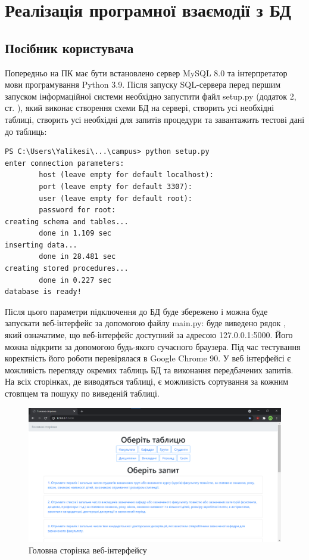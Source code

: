 \newpage
\chapter{Реалізація програмної взаємодії з БД}
\section{Посібник користувача}
Попередньо на ПК має бути встановлено сервер MySQL 8.0 та інтерпретатор мови програмування Python 3.9.
Після запуску SQL-сервера перед першим запуском інформаційної системи необхідно
запустити файл setup.py (додаток 2, ст. \pageref{setup}), який виконає створення 
схеми БД на сервері, створить усі необхідні таблиці, створить усі необхідні для запитів процедури
та завантажить тестові дані до таблиць:
\begin{lstlisting}[style=code]
PS C:\Users\Yalikesi\...\campus> python setup.py
enter connection parameters:
        host (leave empty for default localhost):
        port (leave empty for default 3307):
        user (leave empty for default root):
        password for root:
creating schema and tables...
        done in 1.109 sec
inserting data...
        done in 28.481 sec
creating stored procedures...
        done in 0.227 sec
database is ready!
\end{lstlisting}
Після цього параметри підключення до БД буде збережено і можна буде запускати веб-інтерфейс за
допомогою файлу main.py: буде виведено рядок ,
який означатиме, що веб-інтерфейс доступний за адресою 127.0.0.1:5000. Його можна відкрити за допомогою
будь-якого сучасного браузера. Під час тестування коректність його роботи перевірялася в Google Chrome 90.
У веб інтерфейсі є можливість перегляду окремих таблиць БД та виконання передбачених запитів.
На всіх сторінках, де виводяться таблиці, є можливість сортування за кожним стовпцем та пошуку по виведеній таблиці.
\begin{figure}[H]
    \centering
    \includegraphics[scale=0.38]{pics/web_main.png}
    \caption{Головна сторінка веб-інтерфейсу}
\end{figure}

